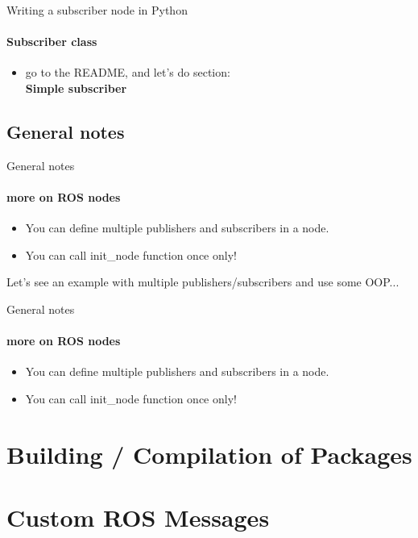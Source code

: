 \documentclass{beamer}
\begin{document}
\begin{frame}[fragile]{Writing a subscriber node in Python}
    \framesubtitle{Subscriber class}
    
    
    \begin{itemize}
        \centering
        \item go to the README, and let's do section:\\ 
        \textbf{Simple subscriber}
    \end{itemize} 
\end{frame}


\subsection{General notes}
\begin{frame}{General notes}
    \framesubtitle{more on ROS nodes}
    \begin{itemize}
        \item You can define multiple publishers and subscribers in a node.
        \item You can call {\ttfamily \colorbox{gray!30!white}{init\_node}} function once only!
    \end{itemize} 
    \vspace{0.5cm}
    Let's see an example with multiple publishers/subscribers and use some OOP...
\end{frame}


\begin{frame}{General notes}
    \framesubtitle{more on ROS nodes}
    \begin{itemize}
        \item You can define multiple publishers and subscribers in a node.
        \item You can call {\ttfamily \colorbox{gray!30!white}{init\_node}} function once only!
    \end{itemize} 
\end{frame}









\section{Building / Compilation of Packages}

\section{Custom ROS Messages}
\end{document}
